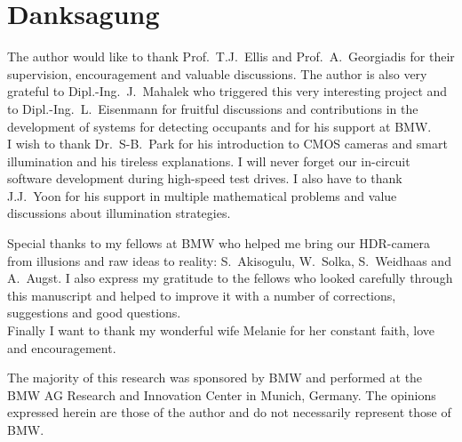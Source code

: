 %
\chapter*{Danksagung}
\label{sec:Ack}%
%
The author would like to thank Prof.~T.J.~Ellis and
Prof.~A.~Georgiadis for their supervision, encouragement and
valuable discussions. The author is also very grateful to
Dipl.-Ing.~J.~Mahalek who triggered this very interesting project
and to Dipl.-Ing.~L.~Eisenmann for fruitful discussions and
contributions in the development of systems for detecting
occupants and for his support at BMW.\\

I wish to thank Dr.~S-B.~Park for his introduction to CMOS cameras
and smart illumination and his tireless explanations. I will never
forget our in-circuit software development during high-speed test
drives. I also have to thank J.J.~Yoon for his support in multiple
mathematical problems and value discussions about illumination
strategies.

Special thanks to my fellows at BMW who helped me bring our
HDR-camera from illusions and raw ideas to reality: S.~Akisogulu,
W.~Solka, S.~Weidhaas and A.~Augst. I also express my gratitude to
the fellows who looked carefully through this manuscript and
helped to improve it with a number of corrections, suggestions and
good
questions.\\

Finally I want to thank my wonderful wife Melanie
for her constant faith, love and encouragement.\\
%
\vspace{4.0cm}
%
\begin{center}
The majority of this research was sponsored by
BMW and
performed at the BMW AG Research and Innovation Center in Munich,
Germany. The opinions expressed herein are those of the author and
do not
necessarily represent those of BMW. %
\end{center}
